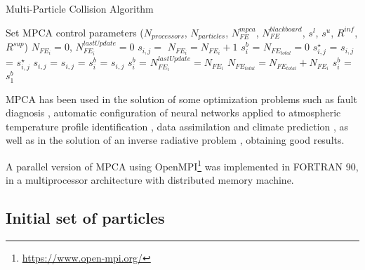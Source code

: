 \begin{algorithm}[H]
\caption{Multi-Particle Collision Algorithm}
\label{alg:mpca}
\footnotesize
\begin{algorithmic}[1]
\State Set MPCA control parameters ($N_{processors}$, $N_{particles}$, $N_{FE}^{mpca}$, $N_{FE}^{blackboard}$, $s^l$, $s^u$, $R^{inf}$, $R^{sup}$)
 
\State $N_{FE{_i}} = 0$, $N_{FE_i}^{lastUpdate} = 0$
\State $s_{i,j} = $ 
\State $N_{FE{_i}} = N_{FE{_i}} + 1$
\EndFor
\State $s^b_i$ =  
\EndFor
{} 
\State $N_{FE{_{total}}} = 0$
\State $s^\star_{i,j}$ = 
\State $s_{i,j}$ = $s^\star_{i,j}$
\State $s_{i,j}$ = 
\Else
\State $s_{i,j}$ = 
\EndIf
{}
\State $s^b_i$ = $s_{i,j}$
\EndIf
\EndFor
{}
 
\State $s^b_i$ = 
\State $N_{FE_i}^{lastUpdate} = N_{FE{_i}}$
\EndFor
\EndIf
\State $N_{FE{_{total}}} = N_{FE{_{total}}} + N_{FE{_i}}$
\EndFor
\EndWhile
{} 
\State $s^b_i$ =  
\EndFor
\State \Return $s^b_1$
\end{algorithmic}
\end{algorithm}

MPCA has been used in the solution of some optimization problems such as fault diagnosis \cite{echevarria2012aplicacion}, automatic configuration of neural networks applied to atmospheric temperature profile identification \cite{sambattiautomatic}, data assimilation \cite{anochiself} and climate prediction \cite{anochi2014optimization}, as well as in the solution of an inverse radiative problem \cite{hdez2015}, obtaining good results.

A parallel version of MPCA using OpenMPI\footnote{\url{https://www.open-mpi.org/}} was implemented in FORTRAN 90, in a multiprocessor architecture with distributed memory machine.

\subsection{Initial set of particles}

